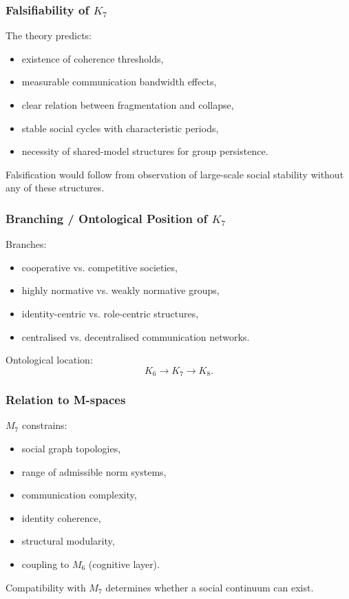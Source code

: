 \subsubsection{Falsifiability of \texorpdfstring{$K_7$}{K_7}}

The theory predicts:
\begin{itemize}
    \item existence of coherence thresholds,
    \item measurable communication bandwidth effects,
    \item clear relation between fragmentation and collapse,
    \item stable social cycles with characteristic periods,
    \item necessity of shared-model structures for group persistence.
\end{itemize}

Falsification would follow from observation of large-scale social stability
without any of these structures.

\subsubsection{Branching / Ontological Position of \texorpdfstring{$K_7$}{K_7}}

Branches:
\begin{itemize}
    \item cooperative vs. competitive societies,
    \item highly normative vs. weakly normative groups,
    \item identity-centric vs. role-centric structures,
    \item centralised vs. decentralised communication networks.
\end{itemize}

Ontological location:
\[
K_6 \to K_7 \to K_8.
\]

\subsubsection{Relation to M-spaces}

$M_7$ constrains:
\begin{itemize}
    \item social graph topologies,
    \item range of admissible norm systems,
    \item communication complexity,
    \item identity coherence,
    \item structural modularity,
    \item coupling to $M_6$ (cognitive layer).
\end{itemize}

Compatibility with $M_7$ determines whether a social continuum can exist.
